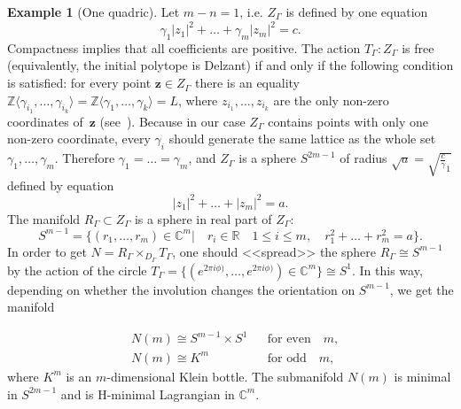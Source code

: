 \documentclass[jsg]{IP_v1_forauthors}
\def\leq{\leqslant}
\theoremstyle{definition}
\numberwithin{equation}{section}
\newtheorem{exam}{Example}
\begin{document}
\begin{exam}[One quadric]
Let $m-n=1$, i.e. $Z_\Gamma$ is defined by one equation
\begin{equation}
\gamma_1 |z_1|^2 + \ldots + \gamma_m |z_m|^2=c.
\end{equation}
Compactness implies that all coefficients are positive. The action $T_\Gamma \colon Z_\Gamma$ is free (equivalently, the initial polytope is Delzant) if and only if the following condition is satisfied: for every point $\boldsymbol{z} \in Z_\Gamma$ there is an equality ${\mathbb Z} \langle \gamma_{i_1},\ldots ,\gamma_{i_k} \rangle ={\mathbb Z} \langle \gamma_{1},\ldots ,\gamma_{k} \rangle =L$,
where $z_{i_1},\ldots,z_{i_k}$ are the only non-zero coordinates of~$\boldsymbol{z}$ (see~\cite[Theorem 4.1]{MP}). Because in our case $Z_\Gamma$ contains points with only one non-zero coordinate, every $\gamma_i$ should generate the same lattice as the whole set $\gamma_1,\ldots,\gamma_m$. Therefore $\gamma_1=\ldots =\gamma_m$, and $Z_\Gamma$ is a sphere $S^{2m-1}$ of radius $\sqrt{a}=\sqrt{\frac c \gamma_1}$ defined by equation
\begin{equation}|z_1|^2 + \ldots + |z_m|^2=a.
\end{equation}
The manifold $R_\Gamma \subset Z_\Gamma$ is a sphere in real part of $Z_\Gamma$:
\begin{equation}
S^{m-1}=\{ (r_1,\ldots,r_m) \in {\mathbb C}^m |\quad r_i \in {\mathbb R} \quad 1 \leq i \leq m,\quad r_1^2 + \ldots +r_{m}^2=a \}.
\end{equation}
In order to get $N=R_\Gamma \times_{D_\Gamma} T_\Gamma $, one should <<spread>> the sphere $R_\Gamma \cong S^{m-1}$ by the action of the circle $T_\Gamma= \{(e^{2\pi i \phi)},\dots,e^{2\pi i \phi)}) \in {\mathbb C}^m \} \cong S^1$. In this way, depending on whether the involution changes the orientation on $S^{m-1}$, we get the manifold


\begin{equation}
\begin{aligned}
&N(m) \cong S^{m-1}\times S^1 && \text{for even} \quad m, \\
&N(m) \cong K^m && \text{for odd} \quad m,
\end{aligned}
\end{equation}
where $K^m$ is an $m$-dimensional Klein bottle.
The submanifold $N(m)$ is minimal in $S^{2m-1}$ and is H-minimal Lagrangian in ${\mathbb C}^m$.
\end{exam}
\end{document}
